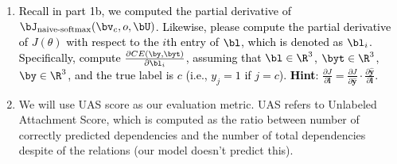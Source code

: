 \begin{parts}
\begin{enumerate}[label=\roman*.]
        
        \item \textcolor{black}{Recall in part 1b, we computed the partial derivative of $\bJ_{\text{naive-softmax}}(\bv_c, o, \bU)$. Likewise, please compute the partial derivative of $J(\theta)$ with respect to the $i$th entry of $\bl$, which is denoted as $\bl_i$. Specifically, compute $\frac{\partial CE(\by, \byt)}{\partial \bl_i}$, assuming that $\bl \in \R^3$, $\byt \in \R^3$, $\by \in \R^3$, and the true label is $c$ (i.e., $y_j=1$ if $j=c$).
        \textbf{Hint}:  $\frac{\partial J}{\partial \mathbf{l}} = \frac{\partial J}{\partial \hat{\mathbf{y}}} \cdot \frac{\partial \hat{\mathbf{y}}}{\partial \mathbf{l}}$.}
        
        \item We will use UAS score as our evaluation metric. UAS refers to Unlabeled Attachment Score, which is computed as the ratio between number of correctly predicted dependencies and the number of total dependencies despite of the relations (our model doesn't predict this).\newline
    

\end{enumerate}
\end{parts}
